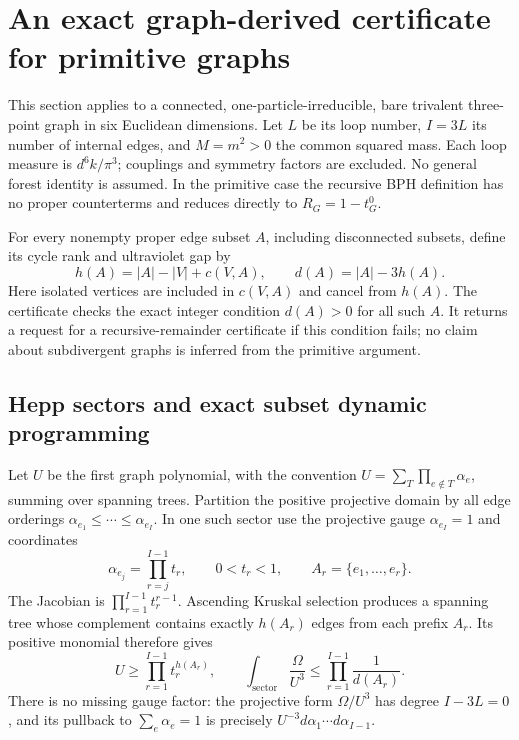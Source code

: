\section{An exact graph-derived certificate for primitive graphs}

This section applies to a connected, one-particle-irreducible, bare trivalent
three-point graph in six Euclidean dimensions.  Let $L$ be its loop number,
$I=3L$ its number of internal edges, and $M=m^2>0$ the common squared mass.
Each loop measure is $d^6k/\pi^3$; couplings and symmetry factors are excluded.
No general forest identity is assumed.  In the primitive case the recursive
BPH definition has no proper counterterms and reduces directly to
$R_G=1-t_G^0$.

For every nonempty proper edge subset $A$, including disconnected subsets,
define its cycle rank and ultraviolet gap by
\begin{equation}
 h(A)=|A|-|V|+c(V,A),\qquad d(A)=|A|-3h(A).
 \label{eq:automatic-gap}
\end{equation}
Here isolated vertices are included in $c(V,A)$ and cancel from $h(A)$.
The certificate checks the exact integer condition $d(A)>0$ for all such
$A$.  It returns a request for a recursive-remainder certificate if this
condition fails; no claim about subdivergent graphs is inferred from the
primitive argument.

\subsection{Hepp sectors and exact subset dynamic programming}

Let $U$ be the first graph polynomial, with the convention
$U=\sum_T\prod_{e\notin T}\alpha_e$, summing over spanning trees.
Partition the positive projective domain by all edge orderings
$\alpha_{e_1}\leq\cdots\leq\alpha_{e_I}$.  In one such sector use the
projective gauge $\alpha_{e_I}=1$ and coordinates
\begin{equation}
 \alpha_{e_j}=\prod_{r=j}^{I-1}t_r,\qquad
 0<t_r<1,\qquad
 A_r=\{e_1,\ldots,e_r\}.
\end{equation}
The Jacobian is $\prod_{r=1}^{I-1}t_r^{r-1}$.  Ascending Kruskal selection
produces a spanning tree whose complement contains exactly $h(A_r)$ edges
from each prefix $A_r$.  Its positive monomial therefore gives
\begin{equation}
 U\geq\prod_{r=1}^{I-1}t_r^{h(A_r)},\qquad
 \int_{\text{sector}}\frac{\Omega}{U^3}
 \leq\prod_{r=1}^{I-1}\frac{1}{d(A_r)}.
 \label{eq:automatic-sector}
\end{equation}
There is no missing gauge factor: the projective form $\Omega/U^3$ has
degree $I-3L=0$, and its pullback to $\sum_e\alpha_e=1$ is precisely
$U^{-3}d\alpha_1\cdots d\alpha_{I-1}$.

